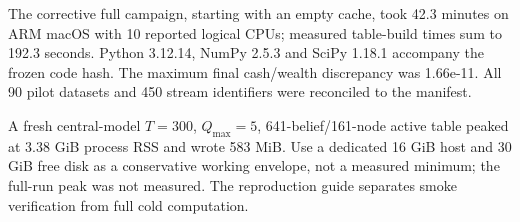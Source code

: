 The corrective full campaign, starting with an empty cache, took 42.3 minutes on ARM macOS with 10 reported logical CPUs; measured table-build times sum to 192.3 seconds. Python 3.12.14, NumPy 2.5.3 and SciPy 1.18.1 accompany the frozen code hash. The maximum final cash/wealth discrepancy was 1.66e-11. All 90 pilot datasets and 450 stream identifiers were reconciled to the manifest.

A fresh central-model $T=300$, $Q_{\max}=5$, 641-belief/161-node active table peaked at 3.38 GiB process RSS and wrote 583 MiB. Use a dedicated 16 GiB host and 30 GiB free disk as a conservative working envelope, not a measured minimum; the full-run peak was not measured. The reproduction guide separates smoke verification from full cold computation.
